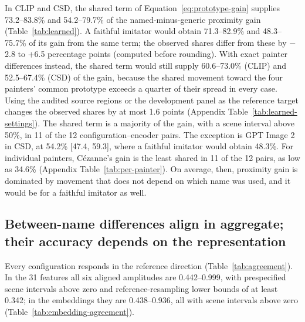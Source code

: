 \documentclass[10pt]{article}
\begin{document}
In CLIP and CSD, the shared term of Equation~\ref{eq:prototype-gain} supplies 73.2--83.8\% and
54.2--79.7\% of the named-minus-generic proximity gain (Table~\ref{tab:learned}). A faithful
imitator would obtain 71.3--82.9\% and 48.3--75.7\% of its gain from the same term; the observed
shares differ from these by $-$2.8 to +6.5 percentage points (computed before rounding). With exact
painter differences instead, the shared term would still supply 60.6--73.0\% (CLIP) and
52.5--67.4\% (CSD) of the gain, because the shared movement toward the four painters' common
prototype exceeds a quarter of their spread in every case. Using the audited source regions or the
development panel as the reference target changes the observed shares by at most 1.6 points
(Appendix Table~\ref{tab:learned-settings}). The shared term is a majority of the gain, with a scene
interval above 50\%, in 11 of the 12 configuration--encoder pairs. The exception is GPT Image 2 in
CSD, at 54.2\% [47.4, 59.3], where a faithful imitator would obtain 48.3\%. For individual
painters, C\'ezanne's gain is the least shared in 11 of the 12 pairs, as low as 34.6\% (Appendix
Table~\ref{tab:per-painter}). On average, then, proximity gain is dominated by movement that does
not depend on which name was used, and it would be for a faithful imitator as well.

\subsection{Between-name differences align in aggregate; their accuracy depends on the representation}\label{sec:agreement}



Every configuration responds in the reference direction (Table~\ref{tab:agreement}). In the 31
features all six aligned amplitudes are 0.442--0.999, with prespecified scene intervals above zero
and reference-resampling lower bounds of at least 0.342; in the embeddings they are 0.438--0.936,
all with scene intervals above zero (Table~\ref{tab:embedding-agreement}).
\end{document}
